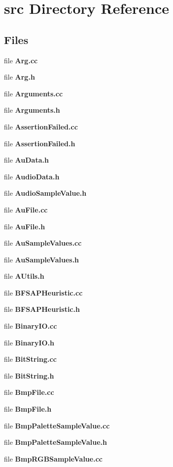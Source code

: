 \section{src Directory Reference}
\label{dir_68267d1309a1af8e8297ef4c3efbcdba}
\subsection*{Files}
\begin{DoxyCompactItemize}
\item 
file \textbf{ Arg.\+cc}
\item 
file \textbf{ Arg.\+h}
\item 
file \textbf{ Arguments.\+cc}
\item 
file \textbf{ Arguments.\+h}
\item 
file \textbf{ Assertion\+Failed.\+cc}
\item 
file \textbf{ Assertion\+Failed.\+h}
\item 
file \textbf{ Au\+Data.\+h}
\item 
file \textbf{ Audio\+Data.\+h}
\item 
file \textbf{ Audio\+Sample\+Value.\+h}
\item 
file \textbf{ Au\+File.\+cc}
\item 
file \textbf{ Au\+File.\+h}
\item 
file \textbf{ Au\+Sample\+Values.\+cc}
\item 
file \textbf{ Au\+Sample\+Values.\+h}
\item 
file \textbf{ A\+Utils.\+h}
\item 
file \textbf{ B\+F\+S\+A\+P\+Heuristic.\+cc}
\item 
file \textbf{ B\+F\+S\+A\+P\+Heuristic.\+h}
\item 
file \textbf{ Binary\+I\+O.\+cc}
\item 
file \textbf{ Binary\+I\+O.\+h}
\item 
file \textbf{ Bit\+String.\+cc}
\item 
file \textbf{ Bit\+String.\+h}
\item 
file \textbf{ Bmp\+File.\+cc}
\item 
file \textbf{ Bmp\+File.\+h}
\item 
file \textbf{ Bmp\+Palette\+Sample\+Value.\+cc}
\item 
file \textbf{ Bmp\+Palette\+Sample\+Value.\+h}
\item 
file \textbf{ Bmp\+R\+G\+B\+Sample\+Value.\+cc}
\item 

\end{DoxyCompactItemize}
